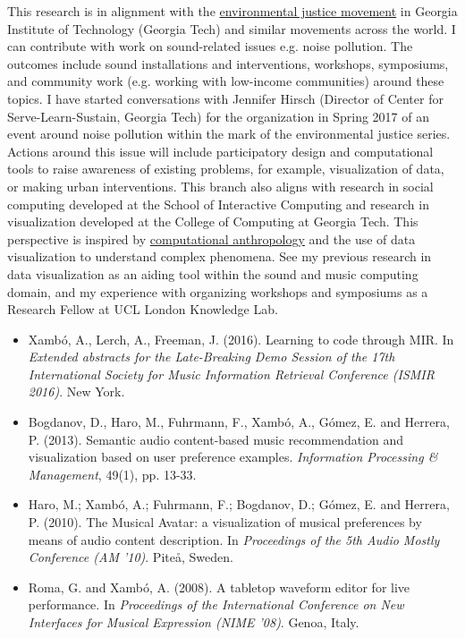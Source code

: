 \documentclass[10pt, a4paper]{article}
\begin{document}
This research is in alignment with the \href{http://serve-learn-sustain.gatech.edu/environmental-justice-series}{environmental justice movement} in Georgia Institute of Technology (Georgia Tech) and similar movements across the world. I can contribute with work on sound-related issues e.g. noise pollution. The outcomes include sound installations and interventions, workshops, symposiums, and community work (e.g. working with low-income communities) around these topics. I have started conversations with Jennifer Hirsch (Director of Center for Serve-Learn-Sustain, Georgia Tech) for the organization in Spring 2017 of an event around noise pollution within the mark of the environmental justice series.
Actions around this issue will include participatory design and computational tools to raise awareness of existing problems, for example, visualization of data, or making urban interventions. This branch also aligns with research in social computing developed at the School of Interactive Computing and research in visualization developed at the College of Computing at Georgia Tech. This perspective is inspired by \href{https://www.technologyreview.com/s/528216/the-emerging-science-of-computational-anthropology}{computational anthropology} and the use of data visualization to understand complex phenomena. See my previous research in data visualization as an aiding tool within the sound and music computing domain, and my experience with organizing workshops and symposiums as a Research Fellow at UCL London Knowledge Lab. 

\begin{itemize}
\item Xambó, A., Lerch, A., Freeman, J. (2016). Learning to code through MIR. In \emph{Extended abstracts for the Late-Breaking Demo Session of the 17th International Society for Music Information Retrieval Conference (ISMIR 2016)}. New York. 
\item Bogdanov, D., Haro, M., Fuhrmann, F., Xambó, A., Gómez, E. and Herrera, P. (2013). Semantic audio content-based music recommendation and visualization based on user preference examples. \emph{Information Processing \& Management}, 49(1), pp. 13-33.
\item Haro, M.; Xambó, A.; Fuhrmann, F.; Bogdanov, D.; Gómez, E. and Herrera, P. (2010). The Musical Avatar: a visualization of musical preferences by means of audio content description. In \emph{Proceedings of the 5th Audio Mostly Conference (AM '10)}. Piteå, Sweden.
\item Roma, G. and Xambó, A. (2008). A tabletop waveform editor for live performance. In \emph{Proceedings of the International Conference on New Interfaces for Musical Expression (NIME '08)}. Genoa, Italy.
\end{itemize}
\end{document}
